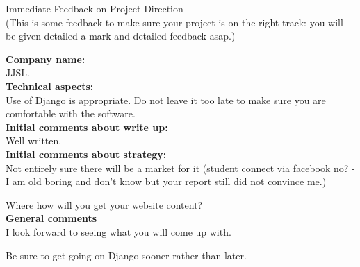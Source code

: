 \documentclass{article}
\begin{document}
\begin{center}
\Huge{Immediate Feedback on Project Direction}\\
\tiny{(This is some feedback to make sure your project is on the right track: you will be given detailed a mark and detailed feedback asap.)}
\end{center}


\normalsize
\textbf{Company name:}\\

JJSL. \\

\textbf{Technical aspects:}\\

Use of Django is appropriate. Do not leave it too late to make sure you are comfortable with the software.\\

\textbf{Initial comments about write up:}\\

Well written.\\

\textbf{Initial comments about strategy:}\\

Not entirely sure there will be a market for it (student connect via facebook no? - I am old boring and don't know but your report still did not convince me.)

Where how will you get your website content?\\

\textbf{General comments}\\

I look forward to seeing what you will come up with.

Be sure to get going on Django sooner rather than later.
\end{document}
